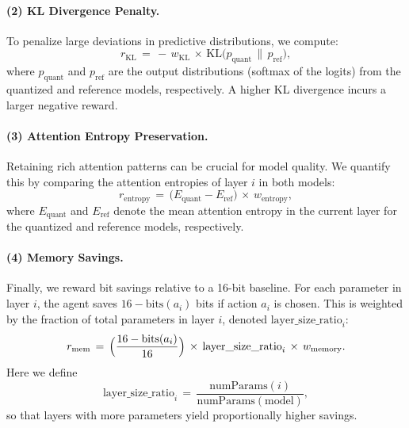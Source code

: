 \documentclass{article}
\begin{document}
    \paragraph{(2) KL Divergence Penalty.}
    To penalize large deviations in predictive distributions, we compute:
    \begin{equation}
    	r_{\mathrm{KL}} 
    	\,=\, 
    	-\, w_{\mathrm{KL}} 
    	\,\times\, 
    	\mathrm{KL}\bigl(p_\text{quant}\,\|\,p_\text{ref}\bigr),
    \end{equation}
    where \(p_\text{quant}\) and \(p_\text{ref}\) are the output distributions (softmax of the logits) from the quantized and reference models, respectively. A higher KL divergence incurs a larger negative reward.
    
    \paragraph{(3) Attention Entropy Preservation.}
    Retaining rich attention patterns can be crucial for model quality. We quantify this by comparing the attention entropies of layer \(i\) in both models:
    \begin{equation}
    	r_{\mathrm{entropy}} 
    	\,=\, 
    	\bigl(E_\text{quant} - E_\text{ref}\bigr)
    	\,\times\, 
    	w_{\mathrm{entropy}},
    \end{equation}
    where \(E_\text{quant}\) and \(E_\text{ref}\) denote the mean attention entropy in the current layer for the quantized and reference models, respectively.
    
    \paragraph{(4) Memory Savings.}
    Finally, we reward bit savings relative to a 16-bit baseline. For each parameter in layer \(i\), the agent saves \(16 - \text{bits}(a_i)\) bits if action \(a_i\) is chosen. This is weighted by the fraction of total parameters in layer \(i\), denoted \(\text{layer\_size\_ratio}_i\):
    \begin{equation}
    	r_{\mathrm{mem}} 
    	\,=\, 
    	\Bigl(\frac{16 - \text{bits}(a_i)}{16}\Bigr)
    	\,\times\,
    	\text{layer\_size\_ratio}_i
    	\,\times\, 
    	w_{\mathrm{memory}}.
    \end{equation}
    Here we define
    \[
    \text{layer\_size\_ratio}_i 
    \,=\, 
    \frac{\text{numParams}(i)}{\text{numParams}(\text{model})},
    \]
    so that layers with more parameters yield proportionally higher savings.
        
\end{document}
